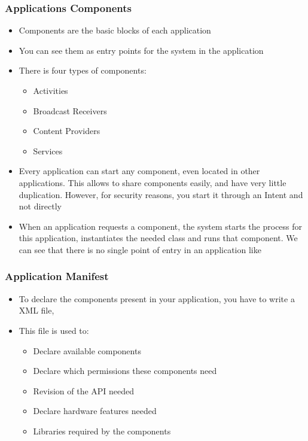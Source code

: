 \begin{frame}
  \frametitle{Applications Components}
  \begin{itemize}
  \item Components are the basic blocks of each application
  \item You can see them as entry points for the system in the application
  \item There is four types of components:
    \begin{itemize}
    \item Activities
    \item Broadcast Receivers
    \item Content Providers
    \item Services
    \end{itemize}
  \item Every application can start any component, even located in
    other applications. This allows to share components easily, and
    have very little duplication. However, for security reasons, you
    start it through an Intent and not directly
  \item When an application requests a component, the system starts
    the process for this application, instantiates the needed class and
    runs that component. We can see that there is no single point of
    entry in an application like 
  \end{itemize}
\end{frame}

\begin{frame}
  \frametitle{Application Manifest}
  \begin{itemize}
  \item To declare the components present in your application, you
    have to write a XML file, 
  \item This file is used to:
    \begin{itemize}
    \item Declare available components
    \item Declare which permissions these components need
    \item Revision of the API needed
    \item Declare hardware features needed
    \item Libraries required by the components
    \end{itemize}
  \end{itemize}
\end{frame}

